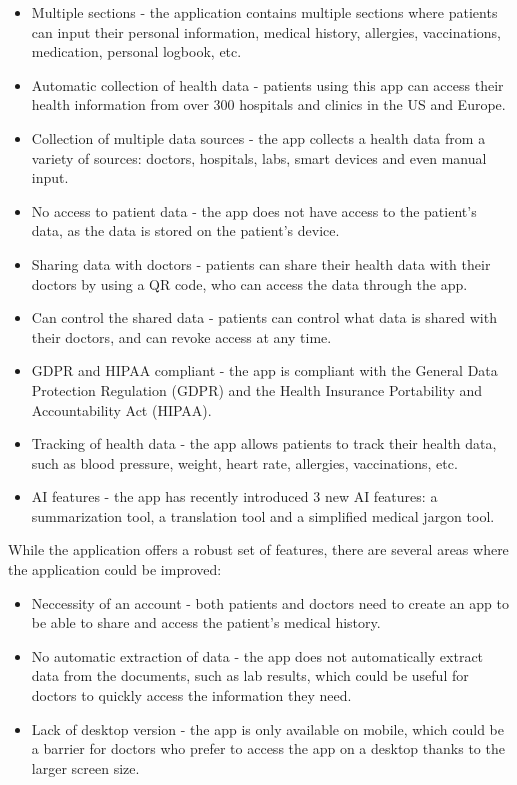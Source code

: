 \begin{itemize}
    \item Multiple sections - the application contains multiple sections where patients can input their personal information, medical history, allergies, vaccinations, medication, personal logbook, etc.
    \item Automatic collection of health data - patients using this app can access their health information from over 300 hospitals and clinics in the US and Europe.
    \item Collection of multiple data sources - the app collects a health data from a variety of sources: doctors, hospitals, labs, smart devices and even manual input.
    \item No access to patient data - the app does not have access to the patient's data, as the data is stored on the patient's device.
    \item Sharing data with doctors - patients can share their health data with their doctors by using a QR code, who can access the data through the app.
    \item Can control the shared data - patients can control what data is shared with their doctors, and can revoke access at any time.
    \item GDPR and HIPAA compliant - the app is compliant with the General Data Protection Regulation (GDPR) and the Health Insurance Portability and Accountability Act (HIPAA).
    \item Tracking of health data - the app allows patients to track their health data, such as blood pressure, weight, heart rate, allergies, vaccinations, etc.
    \item AI features - the app has recently introduced 3 new AI features: a summarization tool, a translation tool and a simplified medical jargon tool.
\end{itemize}

While the application offers a robust set of features, there are several areas where the application could be improved:

\begin{itemize}
    \item Neccessity of an account - both patients and doctors need to create an app to be able to share and access the patient's medical history.
    \item No automatic extraction of data - the app does not automatically extract data from the documents, such as lab results, which could be useful for doctors to quickly access the information they need.
    \item Lack of desktop version - the app is only available on mobile, which could be a barrier for doctors who prefer to access the app on a desktop thanks to the larger screen size.
\end{itemize}

